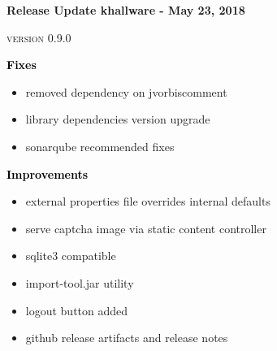\documentclass[notitlepage]{article}
\newcommand{\releasedate}{May 23, 2018}
\begin{document}
\Huge\textbf{\textcolor{myblue}{Release Update khallware - \releasedate{}}}

\small\textsc{version 0.9.0}

\vspace{25px}

\LARGE\textbf{\textcolor{black}{Fixes}}
\normalsize
\begin{center}
\begin{itemize}[label=\raisebox{0.25ex}{\tiny$\bullet$}]
\item removed dependency on jvorbiscomment
\item library dependencies version upgrade
\item sonarqube recommended fixes
\end{itemize}
\end{center}

\vspace{25px}

\LARGE\textbf{\textcolor{black}{Improvements}}
\normalsize
\begin{center}
\begin{itemize}[label=\raisebox{0.25ex}{\tiny$\bullet$}]
\item external properties file overrides internal defaults
\item serve captcha image via static content controller
\item sqlite3 compatible
\item import-tool.jar utility
\item logout button added
\item github release artifacts and release notes
\end{itemize}
\end{center}
\end{document}
